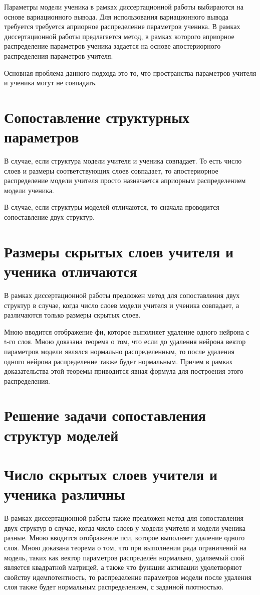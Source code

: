 \documentclass[12pt, twoside]{article}
\begin{document}
Параметры модели ученика в рамках диссертационной работы выбираются на основе вариационного вывода. Для использования вариационного вывода требуется требуется априорное распределение параметров ученика. В рамках диссертационной работы предлагается метод, в рамках которого априорное распределение параметров ученика задается  на основе апостериорного распределения параметров учителя.

Основная проблема данного подхода это то, что пространства параметров учителя и ученика могут не совпадать.

\section{Сопоставление структурных параметров}
В случае, если структура модели учителя и ученика совпадает. То есть число слоев и размеры соответствующих слоев совпадает, то апостериорное распределение модели учителя просто назначается априорным распределением модели ученика.

В случае, если структуры моделей отличаются, то сначала проводится сопоставление двух структур.

\section{Размеры скрытых слоев учителя и ученика отличаются}
В рамках диссертационной работы предложен метод для сопоставления двух структур в случае, когда число слоев модели учителя и ученика совпадает, а различаются только размеры скрытых слоев.

Мною вводится отображение фи, которое выполняет удаление одного нейрона с t-го слоя.
Мною доказана теорема о том, что если до удаления нейрона вектор параметров модели являлся нормально распределенным, то после удаления одного нейрона распределение также будет нормальным. Причем в рамках доказательства этой теоремы приводится явная формула для построения этого распределения.

\section{Решение задачи сопоставления структур моделей}

\section{Число скрытых слоев учителя и ученика различны}
В рамках диссертационной работы также предложен метод для сопоставления двух структур в случае, когда число слоев у модели учителя и модели ученика разные.
Мною вводится отображение пси, которое выполняет удаление одного слоя.
Мною доказана теорема о том, что при выполнении ряда ограничений на модель, таких как вектор параметров распределён нормально, удаляемый слой является квадратной матрицей, а также что функции активации удолетворяют свойству идемпотентность, то распределение параметров модели после удаления слоя также будет нормальным распределением, с заданной плотностью.
\end{document}
